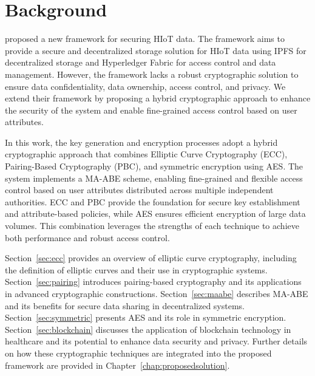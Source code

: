 \documentclass[cic,tc,english]{iiufrgs}
\numberwithin{algorithm}{chapter}
\begin{document}

\chapter{Background}
    \label{chap:background}

    \citet{laura2023} proposed a new framework for securing HIoT data. The framework aims to provide a secure and decentralized storage solution for HIoT data using IPFS \cite{benet2013ipfs} for decentralized storage and Hyperledger Fabric \cite{fabric} for access control and data management. However, the framework lacks a robust cryptographic solution to ensure data confidentiality, data ownership, access control, and privacy. We extend their framework by proposing a hybrid cryptographic approach to enhance the security of the system and enable fine-grained access control based on user attributes.

    In this work, the key generation and encryption processes adopt a hybrid cryptographic approach that combines Elliptic Curve Cryptography (ECC), Pairing-Based Cryptography (PBC), and symmetric encryption using AES. The system implements a MA-ABE scheme, enabling fine-grained and flexible access control based on user attributes distributed across multiple independent authorities. ECC and PBC provide the foundation for secure key establishment and attribute-based policies, while AES ensures efficient encryption of large data volumes. This combination leverages the strengths of each technique to achieve both performance and robust access control.



    Section~\ref{sec:ecc} provides an overview of elliptic curve cryptography, including the definition of elliptic curves and their use in cryptographic systems. Section~\ref{sec:pairing} introduces pairing-based cryptography and its applications in advanced cryptographic constructions. Section~\ref{sec:maabe} describes MA-ABE and its benefits for secure data sharing in decentralized systems. Section~\ref{sec:symmetric} presents AES and its role in symmetric encryption. Section~\ref{sec:blockchain} discusses the application of blockchain technology in healthcare and its potential to enhance data security and privacy. Further details on how these cryptographic techniques are integrated into the proposed framework are provided in Chapter~\ref{chap:proposedsolution}.
    
\end{document}

